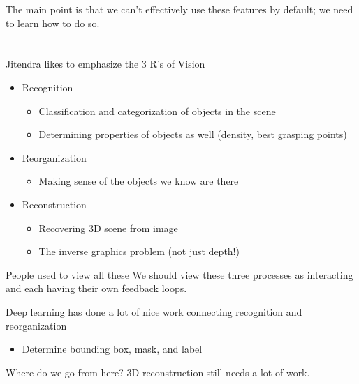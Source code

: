 \documentclass{report}
\begin{document}
    The main point is that we can't effectively use these features by default; we need to learn how to do so.

    \section{}
    Jitendra likes to emphasize the 3 R's of Vision
    \begin{itemize}
        \item Recognition
        \begin{itemize}
            \item Classification and categorization of objects in the scene
            \item Determining properties of objects as well (density, best grasping points)
        \end{itemize}
        \item Reorganization
        \begin{itemize}
            \item Making sense of the objects we know are there %
        \end{itemize}
        \item Reconstruction
        \begin{itemize}
            \item Recovering 3D scene from image
            \item The inverse graphics problem (not just depth!)
        \end{itemize}
    \end{itemize}
    People used to view all these We should view these three processes as interacting and each having their own feedback loops.

    Deep learning has done a lot of nice work connecting recognition and reorganization
    \begin{itemize}
        \item Determine bounding box, mask, and label
    \end{itemize}

    Where do we go from here? 3D reconstruction still needs a lot of work.
\end{document}
